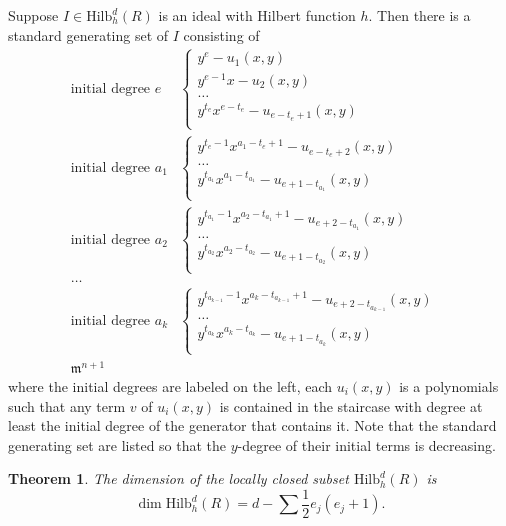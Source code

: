 \documentclass[12pt,oneside,reqno]{amsart}
\newtheorem{theorem}{Theorem}[section]
\theoremstyle{definition}
\begin{document}
Suppose $I \in \mathrm{Hilb}^d_h(R)$ is an ideal with Hilbert function $h$. Then there is a standard generating set of $I$ consisting of 
\begin{align*}
\textrm{initial degree } e
& \begin{cases}
y^e - u_1(x, y) \\
y^{e - 1}x - u_2(x, y) \\
\dots & \\
y^{t_e}x^{e - t_e} - u_{e - t_e + 1}(x, y) \\
\end{cases} \\
\textrm{initial degree } a_1
& \begin{cases}
y^{t_e - 1}x^{a_1 - t_e + 1} - u_{e - t_e + 2}(x, y) \\
\dots & \\
y^{t_{a_1}}x^{a_1 - t_{a_1}} - u_{e + 1 - t_{a_1}}(x, y) \\
\end{cases} \\
\textrm{initial degree } a_2
& \begin{cases}
y^{t_{a_1} - 1}x^{a_2 - t_{a_1} + 1} - u_{e + 2 - t_{a_1}}(x, y) \\
\dots & \\
y^{t_{a_2}}x^{a_2 - t_{a_2}} - u_{e + 1 - t_{a_2}}(x, y) \\
\end{cases} \\
\dots & \\
\textrm{initial degree } a_k
& \begin{cases}
y^{t_{a_{k - 1}} - 1}x^{a_k - t_{a_{k - 1}} + 1} - u_{e + 2 - t_{a_{k - 1}}}(x, y) \\
\dots & \\
y^{t_{a_k}}x^{a_k - t_{a_k}} - u_{e + 1 - t_{a_k}}(x, y) \\
\end{cases} \\
\mathfrak{m}^{n + 1} &
\end{align*}
where the initial degrees are labeled on the left, each $u_i(x, y)$ is a polynomials such that any term $v$ of $u_i(x, y)$ is contained in the staircase with degree at least the initial degree of the generator that contains it. Note that the standard generating set are listed so that the $y$-degree of their initial terms is decreasing. 

\begin{theorem}\cite[Thm. 2.12]{I77}
The dimension of the locally closed subset $\mathrm{Hilb}^d_h(R)$ is 
\[
\dim \mathrm{Hilb}^d_h(R) = d - \sum \dfrac{1}{2}e_j(e_j + 1).
\]
\end{theorem}
\end{document}
